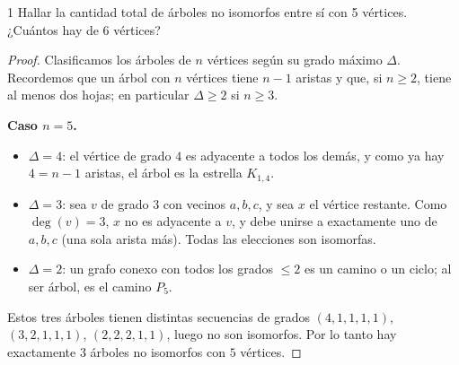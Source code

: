 \begin{ejercicio}{1}
    Hallar la cantidad total de árboles no isomorfos entre sí con 5 vértices. ¿Cuántos hay de 6 vértices?
\end{ejercicio}
\begin{proof}
    Clasificamos los árboles de \( n \) vértices según su grado máximo \( \Delta \). Recordemos que un árbol con \( n \) vértices tiene \( n-1 \) aristas y que, si \( n \geq 2 \), tiene al menos dos hojas; en particular \( \Delta \geq 2 \) si \( n \geq 3 \).

    \textbf{Caso \( n = 5 \).}
    \begin{itemize}
        \item \( \Delta = 4 \): el vértice de grado \( 4 \) es adyacente a todos los demás, y como ya hay \( 4 = n-1 \) aristas, el árbol es la estrella \( K_{1,4} \).
        \item \( \Delta = 3 \): sea \( v \) de grado \( 3 \) con vecinos \( a, b, c \), y sea \( x \) el vértice restante. Como \( \deg(v) = 3 \), \( x \) no es adyacente a \( v \), y debe unirse a exactamente uno de \( a, b, c \) (una sola arista más). Todas las elecciones son isomorfas.
        \item \( \Delta = 2 \): un grafo conexo con todos los grados \( \leq 2 \) es un camino o un ciclo; al ser árbol, es el camino \( P_5 \).
    \end{itemize}
    Estos tres árboles tienen distintas secuencias de grados \( (4,1,1,1,1) \), \( (3,2,1,1,1) \), \( (2,2,2,1,1) \), luego no son isomorfos. Por lo tanto hay exactamente \( 3 \) árboles no isomorfos con \( 5 \) vértices.


\end{proof}

